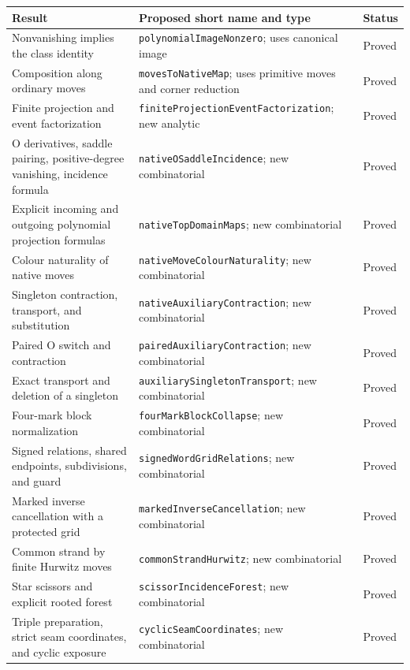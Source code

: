 \documentclass[11pt,a4paper]{article}
\theoremstyle{remark}
\begin{document}
\begin{longtable}{>{\raggedright\arraybackslash}p{}>{\raggedright\arraybackslash}p{}>{\raggedright\arraybackslash}p{}}
\toprule
Result & Proposed short name and type & Status\\
\midrule
\endhead
Nonvanishing implies the class identity &
\texttt{polynomialImageNonzero}; uses canonical image & Proved\\[3pt]
Composition along ordinary moves &
\texttt{movesToNativeMap}; uses primitive moves and corner reduction & Proved\\[3pt]
Finite projection and event factorization &
\texttt{finiteProjectionEventFactorization}; new analytic & Proved\\[3pt]
O derivatives, saddle pairing, positive-degree vanishing, incidence formula &
\texttt{nativeOSaddleIncidence}; new combinatorial & Proved\\[3pt]
Explicit incoming and outgoing polynomial projection formulas &
\texttt{nativeTopDomainMaps}; new combinatorial & Proved\\[3pt]
Colour naturality of native moves &
\texttt{nativeMoveColourNaturality}; new combinatorial & Proved\\[3pt]
Singleton contraction, transport, and substitution &
\texttt{nativeAuxiliaryContraction}; new combinatorial & Proved\\[3pt]
Paired O switch and contraction &
\texttt{pairedAuxiliaryContraction}; new combinatorial & Proved\\[3pt]
Exact transport and deletion of a singleton &
\texttt{auxiliarySingletonTransport}; new combinatorial & Proved\\[3pt]
Four-mark block normalization &
\texttt{fourMarkBlockCollapse}; new combinatorial & Proved\\[3pt]
Signed relations, shared endpoints, subdivisions, and guard &
\texttt{signedWordGridRelations}; new combinatorial & Proved\\[3pt]
Marked inverse cancellation with a protected grid &
\texttt{markedInverseCancellation}; new combinatorial & Proved\\[3pt]
Common strand by finite Hurwitz moves &
\texttt{commonStrandHurwitz}; new combinatorial & Proved\\[3pt]
Star scissors and explicit rooted forest &
\texttt{scissorIncidenceForest}; new combinatorial & Proved\\[3pt]
Triple preparation, strict seam coordinates, and cyclic exposure &
\texttt{cyclicSeamCoordinates}; new combinatorial & Proved\\[3pt]

\end{longtable}
\end{document}
